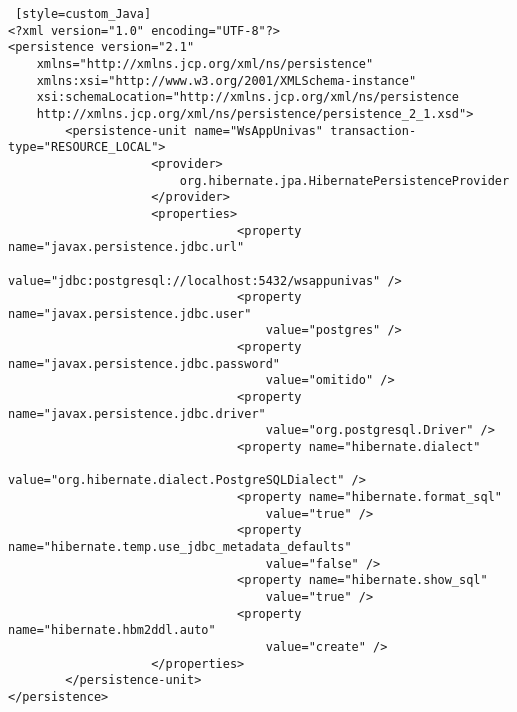 \begin{lstlisting} [style=custom_Java]
<?xml version="1.0" encoding="UTF-8"?>
<persistence version="2.1"
	xmlns="http://xmlns.jcp.org/xml/ns/persistence" 
	xmlns:xsi="http://www.w3.org/2001/XMLSchema-instance"
	xsi:schemaLocation="http://xmlns.jcp.org/xml/ns/persistence
	http://xmlns.jcp.org/xml/ns/persistence/persistence_2_1.xsd">
		<persistence-unit name="WsAppUnivas" transaction-type="RESOURCE_LOCAL">
					<provider>
						org.hibernate.jpa.HibernatePersistenceProvider
					</provider>
					<properties>
								<property name="javax.persistence.jdbc.url"
									value="jdbc:postgresql://localhost:5432/wsappunivas" />
								<property name="javax.persistence.jdbc.user" 
									value="postgres" />
								<property name="javax.persistence.jdbc.password" 
									value="omitido" />
								<property name="javax.persistence.jdbc.driver" 
									value="org.postgresql.Driver" />
								<property name="hibernate.dialect" 
									value="org.hibernate.dialect.PostgreSQLDialect" />
								<property name="hibernate.format_sql" 
									value="true" />
								<property name="hibernate.temp.use_jdbc_metadata_defaults"
									value="false" />
								<property name="hibernate.show_sql" 
									value="true" />
								<property name="hibernate.hbm2ddl.auto" 
									value="create" />
					</properties>
		</persistence-unit>
</persistence>
	
\end{lstlisting}